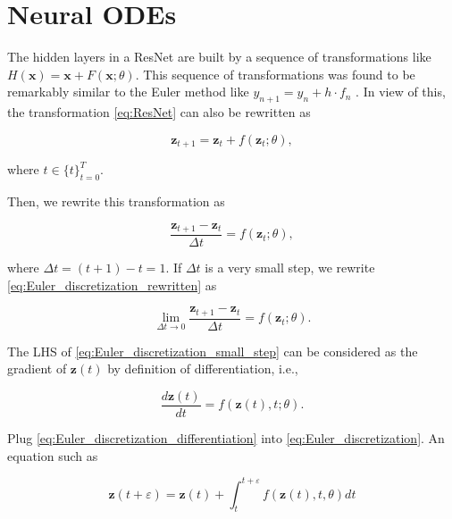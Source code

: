 \documentclass[
	parskip, 			   %
	twoside, 			   %
	DIV=14, 			   %
	BCOR=15.0mm, 		   %
	headsepline, 		   %
	open=right, 		   %
	captions=tableheading, %
	bibliography=totoc,    %
	numbers=noenddot       %
]{scrreprt}
\begin{document}
\section{Neural ODEs}
The hidden layers in a ResNet are built by a sequence of transformations like $H(\mathbf{x})=\mathbf{x}+F(\mathbf{x};\theta)$. This sequence of transformations was found to be remarkably similar to the Euler method like $y_{n+1} = y_{n} + h \cdot f_{n}$ \cite{ruthotto2020deep}. In view of this, the transformation \ref{eq:ResNet} can also be rewritten as

\begin{equation}
    \label{eq:Euler_discretization}
    \mathbf{z}_{t+1} = \mathbf{z}_{t} + f(\mathbf{z}_{t}; \theta),
\end{equation}

where $t \in \{t\}_{t=0}^T$.

Then, we rewrite this transformation as 

\begin{equation}
    \label{eq:Euler_discretization_rewritten}
    \frac{\mathbf{z}_{t+1}-\mathbf{z}_{t}}{\Delta t} = f(\mathbf{z}_{t}; \theta),
\end{equation}

where $\Delta t = (t+1)-t = 1$. If $\Delta t$ is a very small step, we rewrite \ref{eq:Euler_discretization_rewritten} as

\begin{equation}
    \label{eq:Euler_discretization_small_step}
    \lim_{\Delta t \to 0} \frac{\mathbf{z}_{t+1}-\mathbf{z}_{t}}{\Delta t} = f(\mathbf{z}_{t}; \theta).
\end{equation}

The LHS of \ref{eq:Euler_discretization_small_step} can be considered as the gradient of $\mathbf{z}(t)$ by definition of differentiation, i.e.,

\begin{equation}
    \label{eq:Euler_discretization_differentiation}
    \frac{d\mathbf{z}(t)}{dt} = f(\mathbf{z}(t), t; \theta).
\end{equation}

Plug \ref{eq:Euler_discretization_differentiation} into \ref{eq:Euler_discretization}. An equation such as 

\begin{equation}
    \label{eq:Neural_ODE}
    \mathbf{z}(t+\varepsilon ) = \mathbf{z}(t) + \int_{t}^{t+\varepsilon } f(\mathbf{z}(t), t, \theta)dt
\end{equation}
\end{document}
